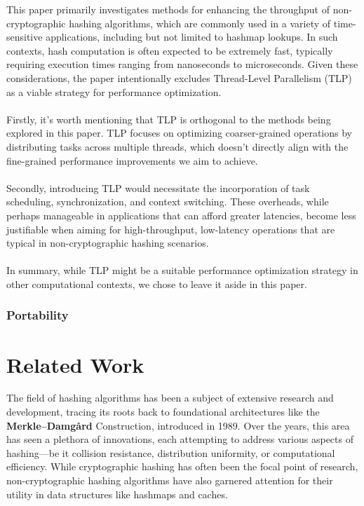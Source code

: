 \documentclass[10pt]{article}
\begin{document}
This paper primarily investigates methods for enhancing the throughput of non-cryptographic hashing algorithms,
which are commonly used in a variety of time-sensitive applications, including but not limited to hashmap lookups.
In such contexts, hash computation is often expected to be extremely fast, typically requiring execution times ranging
from nanoseconds to microseconds. Given these considerations, the paper intentionally excludes Thread-Level Parallelism
(TLP) as a viable strategy for performance optimization.\\\\
Firstly, it's worth mentioning that TLP is orthogonal to the methods being explored in this paper.
TLP focuses on optimizing coarser-grained operations by distributing tasks across multiple threads,
which doesn't directly align with the fine-grained performance improvements we aim to achieve.\\\\
Secondly, introducing TLP would necessitate the incorporation of task scheduling, synchronization, and context switching.
These overheads, while perhaps manageable in applications that can afford greater latencies, become less justifiable when
aiming for high-throughput, low-latency operations that are typical in non-cryptographic hashing scenarios.\\\\
In summary, while TLP might be a suitable performance optimization strategy in other computational contexts, we chose to
leave it aside in this paper.

\subsubsection{Portability}

\clearpage
\section{Related Work}

The field of hashing algorithms has been a subject of extensive research and development, tracing its roots back to foundational architectures like
the \textbf{Merkle–Damgård} Construction\cite{merkle}\cite{damgard}, introduced in 1989. Over the years, this area has seen a plethora of innovations, each attempting to address various
aspects of hashing—be it collision resistance, distribution uniformity, or computational efficiency. While cryptographic hashing has often been the focal
point of research, non-cryptographic hashing algorithms have also garnered attention for their utility in data structures like hashmaps and caches.
\end{document}
